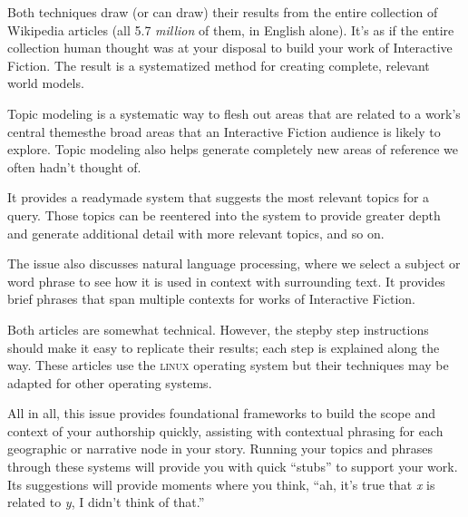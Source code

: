 Both techniques draw (or can draw) their results from the entire collection of Wikipedia articles
(all 5.7 \emph{million} of them, in English alone). It's as if the entire collection human thought was at
your disposal to build your work of
Interactive Fiction. The result is a systematized method for creating complete,
relevant world models.

Topic modeling is a systematic way to flesh out 
areas that are related to a work's central themes\textemdash the broad areas that an
Interactive Fiction audience is likely to
explore. Topic modeling also helps generate completely new areas of reference
we often hadn't thought of.

It provides a ready\textendash made system that suggests
the most relevant topics for a query. Those topics
can be re\textendash entered into the system to provide greater depth and
generate additional detail with more
relevant topics, and so on.

The issue also discusses natural language processing, where we select a subject or
word phrase to see how it is used in context with surrounding text. It provides 
brief phrases that span multiple contexts for works of Interactive Fiction.

Both articles are somewhat technical. However, the step\textendash by\textendash
step instructions should make it easy to replicate their results; each step is
explained along the way. These articles use the \textsc{linux} operating
system but their techniques may be adapted for other operating systems.




All in all, this issue provides foundational frameworks to build the
scope and context of your authorship quickly, assisting with contextual phrasing for each
geographic or narrative node in your story. Running your topics and phrases
through these systems will provide you with quick ``stubs'' to support 
your work. Its suggestions will provide moments where you think, ``ah, it's true that \textit{x} is related to
\textit{y}, I didn't think of that.''

